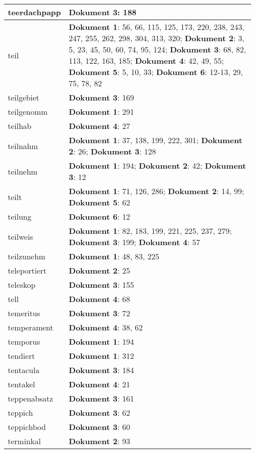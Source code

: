 \documentclass[a5paper]{article}
\begin{document}
\begin{longtable}[l]{|l|p{3in}|}
\hline
teerdachpapp & \textbf{Dokument 3}: 188 \\
\hline
teil & \textbf{Dokument 1}: 56, 66, 115, 125, 173, 220, 238, 243, 247, 255, 262, 298, 304, 313, 320; \textbf{Dokument 2}: 3, 5, 23, 45, 50, 60, 74, 95, 124; \textbf{Dokument 3}: 68, 82, 113, 122, 163, 185; \textbf{Dokument 4}: 42, 49, 55; \textbf{Dokument 5}: 5, 10, 33; \textbf{Dokument 6}: 12-13, 29, 75, 78, 82 \\
\hline
teilgebiet & \textbf{Dokument 3}: 169 \\
\hline
teilgenomm & \textbf{Dokument 1}: 291 \\
\hline
teilhab & \textbf{Dokument 4}: 27 \\
\hline
teilnahm & \textbf{Dokument 1}: 37, 138, 199, 222, 301; \textbf{Dokument 2}: 26; \textbf{Dokument 3}: 128 \\
\hline
teilnehm & \textbf{Dokument 1}: 194; \textbf{Dokument 2}: 42; \textbf{Dokument 3}: 12 \\
\hline
teilt & \textbf{Dokument 1}: 71, 126, 286; \textbf{Dokument 2}: 14, 99; \textbf{Dokument 5}: 62 \\
\hline
teilung & \textbf{Dokument 6}: 12 \\
\hline
teilweis & \textbf{Dokument 1}: 82, 183, 199, 221, 225, 237, 279; \textbf{Dokument 3}: 199; \textbf{Dokument 4}: 57 \\
\hline
teilzunehm & \textbf{Dokument 1}: 48, 83, 225 \\
\hline
teleportiert & \textbf{Dokument 2}: 25 \\
\hline
teleskop & \textbf{Dokument 3}: 155 \\
\hline
tell & \textbf{Dokument 4}: 68 \\
\hline
temeritus & \textbf{Dokument 3}: 72 \\
\hline
temperament & \textbf{Dokument 4}: 38, 62 \\
\hline
temporus & \textbf{Dokument 1}: 194 \\
\hline
tendiert & \textbf{Dokument 1}: 312 \\
\hline
tentacula & \textbf{Dokument 3}: 184 \\
\hline
tentakel & \textbf{Dokument 4}: 21 \\
\hline
teppenabsatz & \textbf{Dokument 3}: 161 \\
\hline
teppich & \textbf{Dokument 3}: 62 \\
\hline
teppichbod & \textbf{Dokument 3}: 60 \\
\hline
terminkal & \textbf{Dokument 2}: 93 \\

\end{longtable}
\end{document}
